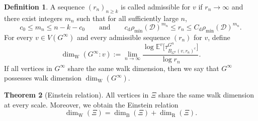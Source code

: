 \documentclass{article}
\theoremstyle{plain}
\theoremstyle{definition}
\newtheorem{theorem}{Theorem}[section]
\newtheorem{definition}[theorem]{Definition}
\newcommand{\dist}{\mathrm{d}}
\newcommand{\dimbox}{\dim_\mathrm{B}}
\newcommand{\dimwalk}{\dim_\mathrm{W}}
\newcommand{\dimresis}{\dim_\mathrm{R}}
\begin{document}
\begin{definition}\label{def:walk_dimension}
A sequence $(r_n)_{n\ge k}$ is called admissible for $v$ if $r_n\to\infty$ and there exist integers $m_n$ such that for all sufficiently large $n$,
\[
c_0\le m_n\le n-k-c_0
\qquad\text{and}\qquad
c_{\dist}\rho_{\min}(\mathcal D)^{m_n}\le r_n\le C_{\dist}\rho_{\min}(\mathcal D)^{m_n}.
\]
For every $v\in V(G^\infty)$ and every admissible sequence $(r_n)$ for $v$, define
\[
\dimwalk(G^\infty:v)
:=
\lim_{n\to\infty}
\frac{\log \mathbb E^v\big[\tau_{B_{G^n}(v,r_n)^{\mathrm c}}^{G^n}\big]}{\log r_n}.
\]
If all vertices in $G^\infty$ share the same walk dimension, then we say that $G^\infty$ possesses walk dimension $\dimwalk(G^\infty)$.
\end{definition}

\begin{theorem}[Einstein relation]\label{thm:Einstein}
All vertices in $\Xi$ share the same walk dimension at every scale.
Moreover, we obtain the Einstein relation
\[
\dimwalk(\Xi)=\dimbox(\Xi)+\dimresis(\Xi).
\]
\end{theorem}
\end{document}
